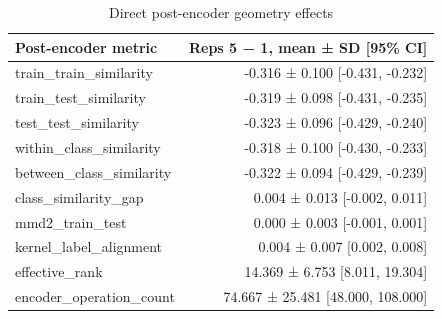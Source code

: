 \begin{table}
\caption{Direct post-encoder geometry effects}
\label{tab:satml_geometry}
\begin{tabular}{lr}
\toprule
Post-encoder metric & Reps 5 − 1, mean ± SD [95\% CI] \\
\midrule
train\_train\_similarity & -0.316 ± 0.100 [-0.431, -0.232] \\
train\_test\_similarity & -0.319 ± 0.098 [-0.431, -0.235] \\
test\_test\_similarity & -0.323 ± 0.096 [-0.429, -0.240] \\
within\_class\_similarity & -0.318 ± 0.100 [-0.430, -0.233] \\
between\_class\_similarity & -0.322 ± 0.094 [-0.429, -0.239] \\
class\_similarity\_gap & 0.004 ± 0.013 [-0.002, 0.011] \\
mmd2\_train\_test & 0.000 ± 0.003 [-0.001, 0.001] \\
kernel\_label\_alignment & 0.004 ± 0.007 [0.002, 0.008] \\
effective\_rank & 14.369 ± 6.753 [8.011, 19.304] \\
encoder\_operation\_count & 74.667 ± 25.481 [48.000, 108.000] \\
\bottomrule
\end{tabular}
\end{table}


